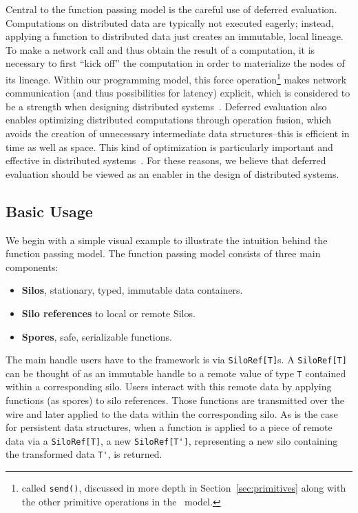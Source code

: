 \documentclass{jfp1}
\begin{document}
Central to the function passing model is the careful use of deferred evaluation.
Computations on distributed data are typically not executed eagerly; instead,
applying a function to distributed data just creates an immutable, local
lineage. To make a network call and thus obtain the result of a computation, it
is necessary to first ``kick off'' the computation in order to materialize the
nodes of its lineage. Within our programming model, this force operation\footnote{called
\texttt{send()}, discussed in more depth in Section~\ref{sec:primitives} along with 
the other primitive operations in the \FP~model.} makes 
network communication (and thus possibilities for latency)
explicit, which is considered to be a strength when designing distributed
systems~\cite{ANoteDistComp}. Deferred evaluation also enables optimizing
distributed computations through operation fusion, which avoids the creation of
unnecessary intermediate data structures--this is efficient in time as well as
space. This kind of optimization is particularly important and effective in
distributed systems~\cite{FlumeJava}. For these reasons, we believe that
deferred evaluation should be viewed as an enabler in the design of distributed
systems.

\subsection{Basic Usage}

We begin with a simple visual example to illustrate the intuition behind the 
function passing model. The function passing model consists of three main components: 

\begin{itemize}
	\item \textbf{Silos}, stationary, typed, immutable data containers.
	\item \textbf{Silo references} to local or remote Silos.
	\item \textbf{Spores}, safe, serializable functions.
\end{itemize}



The main handle users have to the framework is via
\verb|SiloRef[T]|s. A \verb|SiloRef[T]| can be thought of as an
immutable handle to a remote value of type \verb|T| contained within a
corresponding silo. Users interact with this remote data by applying
functions (as spores) to silo references. Those functions are
transmitted over the wire and later applied to the data within the
corresponding silo. As is the case for persistent data structures,
when a function is applied to a piece of remote data via a
\verb|SiloRef[T]|, a new \verb|SiloRef[T']|, representing a new silo
containing the transformed data \verb|T'|, is returned.
\end{document}
